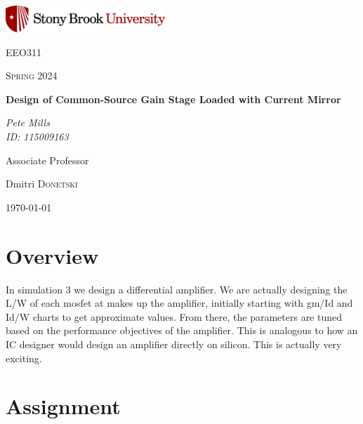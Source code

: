 \documentclass{article}
\begin{document}
	
\begin{titlepage}
	\centering
	\includegraphics[width=0.45\textwidth]{sbu}\par\vspace{1cm}
	{\LARGE \textsc{EEO311}\par}
	\vspace{1cm}
	{\Large \textsc{Spring 2024}\par}
	\vspace{1.5cm}
	{\huge\bfseries Design of Common-Source Gain Stage Loaded with Current Mirror\par}
	\vspace{2cm}
	{\Large\itshape Pete Mills\\ID: 115009163\par}
	\vfill
	Associate Professor\par
	Dmitri \textsc{Donetski}

	\vfill

	{\large \today\par}
\end{titlepage}

	\newcommand{\assName}{ESE411Sim3}

	
	
	

	\section*{Overview}
	
	 In simulation 3 we design a differential amplifier. We are actually designing the L/W of each mosfet at makes up the amplifier, initially starting with gm/Id and Id/W charts to get approximate values. From there, the parameters are tuned based on the performance objectives of the amplifier. This is analogous to how an IC designer would design an amplifier directly on silicon. This is actually very exciting.
	
	\section{Assignment}
\end{document}
